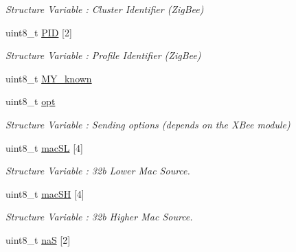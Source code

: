 \begin{DoxyCompactItemize}
\begin{DoxyCompactList}\small\item\em Structure Variable \+: Cluster Identifier (Zig\+Bee) \end{DoxyCompactList}\item 
uint8\+\_\+t \hyperlink{structpacket_x_bee_a03ade9e914d4d99bde2bb82e0c08d42d}{P\+ID} \mbox{[}2\mbox{]}\hypertarget{structpacket_x_bee_a03ade9e914d4d99bde2bb82e0c08d42d}{}\label{structpacket_x_bee_a03ade9e914d4d99bde2bb82e0c08d42d}

\begin{DoxyCompactList}\small\item\em Structure Variable \+: Profile Identifier (Zig\+Bee) \end{DoxyCompactList}\item 
uint8\+\_\+t \hyperlink{structpacket_x_bee_adad7cd3286384979da957eefe7497c36}{M\+Y\+\_\+known}
\item 
uint8\+\_\+t \hyperlink{structpacket_x_bee_a2932a76b7ac73040480ef86e1cc69af2}{opt}\hypertarget{structpacket_x_bee_a2932a76b7ac73040480ef86e1cc69af2}{}\label{structpacket_x_bee_a2932a76b7ac73040480ef86e1cc69af2}

\begin{DoxyCompactList}\small\item\em Structure Variable \+: Sending options (depends on the X\+Bee module) \end{DoxyCompactList}\item 
uint8\+\_\+t \hyperlink{structpacket_x_bee_a7d12b24373be9f7ef090f212325c9d0f}{mac\+SL} \mbox{[}4\mbox{]}\hypertarget{structpacket_x_bee_a7d12b24373be9f7ef090f212325c9d0f}{}\label{structpacket_x_bee_a7d12b24373be9f7ef090f212325c9d0f}

\begin{DoxyCompactList}\small\item\em Structure Variable \+: 32b Lower Mac Source. \end{DoxyCompactList}\item 
uint8\+\_\+t \hyperlink{structpacket_x_bee_ae4e33faa58653944697794687f1b31bb}{mac\+SH} \mbox{[}4\mbox{]}\hypertarget{structpacket_x_bee_ae4e33faa58653944697794687f1b31bb}{}\label{structpacket_x_bee_ae4e33faa58653944697794687f1b31bb}

\begin{DoxyCompactList}\small\item\em Structure Variable \+: 32b Higher Mac Source. \end{DoxyCompactList}\item 
uint8\+\_\+t \hyperlink{structpacket_x_bee_acb5cc5216fd9c4def4cfff746c4ffef8}{naS} \mbox{[}2\mbox{]}\hypertarget{structpacket_x_bee_acb5cc5216fd9c4def4cfff746c4ffef8}{}\label{structpacket_x_bee_acb5cc5216fd9c4def4cfff746c4ffef8}


\end{DoxyCompactItemize}
